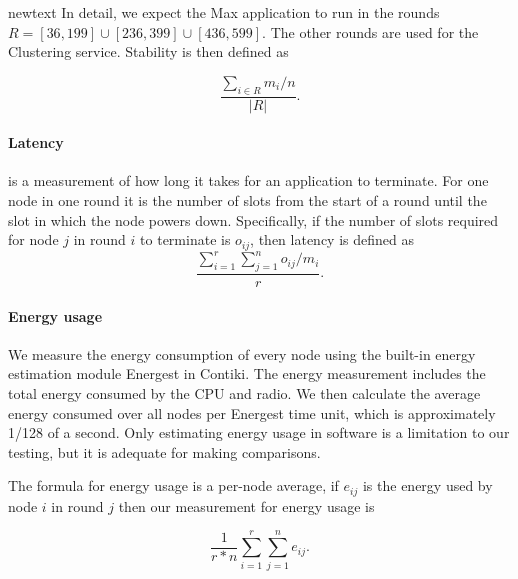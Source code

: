 \begin{newtext}{newtext}
In detail, we expect the Max application to run in the rounds $R = [36,199] \cup [236,399] \cup [436, 599]$. The other rounds are used for the Clustering service. Stability is then defined as 

\begin{equation}
    \frac{\sum\limits_{i \in R}{m_i/n}}{|R|}.
\end{equation}


\paragraph*{Latency} is a measurement of how long it takes for an application to terminate. For one node in one round it is the number of slots from the start of a round until the slot in which the node powers down.  Specifically, if the number of slots required for node $j$ in round $i$ to terminate is $o_{ij}$, then latency is defined as
\begin{equation}
\frac{\sum\limits_{i=1}^{r}{ \sum\limits_{j=1}^{n}{o_{ij} /m_i} }}{r}.
\end{equation}




\paragraph*{Energy usage}
We measure the energy consumption of every node using the built-in energy estimation module Energest in Contiki. The energy measurement includes the total energy consumed by the CPU and radio. We then calculate the average energy consumed over all nodes per Energest time unit, which is approximately 1/128 of a second. Only estimating energy usage in software is a limitation to our testing, but it is adequate for making comparisons.

The formula for energy usage is a per-node average, if $e_{ij}$ is the energy used by node $i$ in round $j$ then our measurement for energy usage is

\begin{equation}
    \frac{1}{r*n} \sum\limits_{i=1}^{r}{ \sum\limits_{j=1}^{n}{e_{ij}} }.
\end{equation}





\end{newtext}
